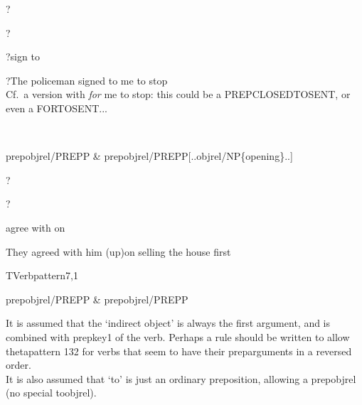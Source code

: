 
\begin{thetadescr}
\evitem ?
\esitem
     \begin{examples}
        \example  ?
     \end{examples}
\end{thetadescr}



\begin{thetadescr}
\evitem ?sign to
\esitem
     \begin{examples}
        \example ?The policeman signed to me to stop\\
        Cf.\ a version with {\em for\/} me to stop: this could be a 
        PREPCLOSEDTOSENT, or even a FORTOSENT...
     \end{examples}
\end{thetadescr}


\newpage
{}
\begin{vpattern}
 \norule
\csritem \mbox{}\\
     \begin{csr}
      prepobjrel/PREPP & prepobjrel/PREPP[..objrel/NP\{opening\}..]
     \end{csr}
\remarksitem 
\end{vpattern}


\begin{thetadescr}
\evitem ?
\esitem
     \begin{examples}
        \example  ?
     \end{examples}
\end{thetadescr}



\begin{thetadescr}
\evitem agree with on
\esitem
     \begin{examples}
        \example They agreed with him (up)on selling the house first
     \end{examples}
\end{thetadescr}


\newpage
{}
\begin{vpattern}
 TVerbpattern7,1
\csritem \mbox{}\\
     \begin{csr}
     prepobjrel/PREPP & prepobjrel/PREPP
     \end{csr}
\remarksitem It is assumed that the `indirect object' is always the first 
argument, and is combined with prepkey1 of the verb. Perhaps a rule should be 
written to allow thetapattern 132 for verbs that seem to have their
preparguments in a reversed order.\\
It is also assumed that 
`to' is just an ordinary preposition, allowing a prepobjrel (no special 
toobjrel). \end{vpattern}

